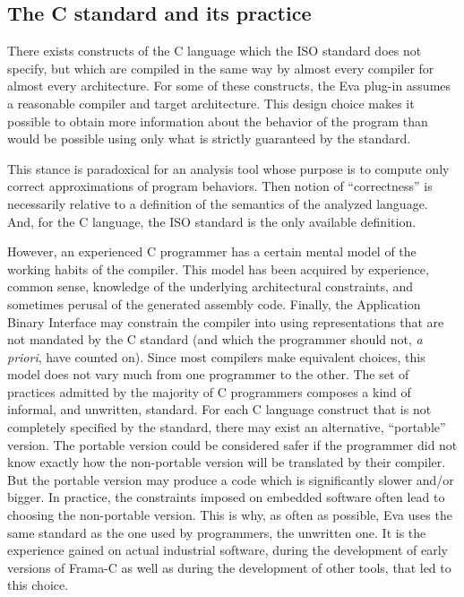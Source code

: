 \documentclass[web]{frama-c-book}
\newcommand{\Eva}{\textsf{Eva}}
\begin{document}
\subsection{The C standard and its practice}
\label{norme_pratique}

There exists constructs of the C language which the ISO standard does
not specify, but which are compiled in the same way by almost every compiler
for almost every architecture. For some of these constructs, the \Eva{} 
plug-in assumes a reasonable compiler and
target architecture. This design choice makes it possible to obtain more
information about the behavior of the program than would be possible
using only what is strictly guaranteed by the standard.
\medskip

This stance is paradoxical for an analysis tool whose purpose is
to compute only correct approximations of program behaviors.
Then notion of ``correctness'' is necessarily relative to a definition
of the semantics of the analyzed language. And, for the C language,
the ISO standard is the only available definition.

However, an experienced C programmer has a certain mental model of the
working habits of the compiler. This model has been acquired by
experience, common sense, knowledge of the underlying architectural
constraints, and sometimes perusal of the generated assembly code.
Finally, the Application Binary Interface may constrain the compiler
into using representations that are not mandated by the C standard
(and which the programmer should not, {\it a priori},
have counted on). Since most compilers make equivalent choices,
this model does not vary much from one programmer to the other.
The set of practices admitted by the majority of C programmers
composes a kind of informal, and unwritten, standard.
For each C language construct that is not completely specified by the
standard, there may exist an alternative, ``portable''
version. The portable version could be considered safer if the
programmer did not know exactly how the non-portable version will be
translated by their compiler. But the portable version may
produce a code which is significantly slower and/or bigger. In practice,
the constraints imposed on embedded software often lead to choosing
the non-portable version. This is why, as often as possible, \Eva{}
uses the same standard as the one used by programmers,
the unwritten one.
It is the experience gained on actual industrial software, during
the development of early versions of Frama-C as well as during
the development of other tools, that led to this choice.
\medskip
\end{document}
